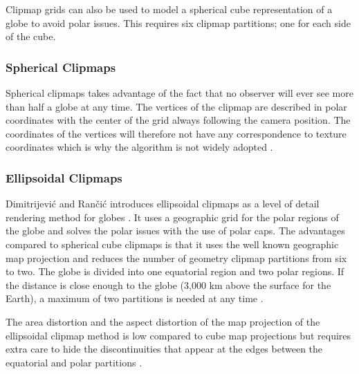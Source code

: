 Clipmap grids can also be used to model a spherical cube representation of a globe to avoid polar issues. This requires six clipmap partitions; one for each side of the cube.

\subsubsection{Spherical Clipmaps}
Spherical clipmaps takes advantage of the fact that no observer will ever see more than half a globe at any time. The vertices of the clipmap are described in polar coordinates with the center of the grid always following the camera position. The coordinates of the vertices will therefore not have any correspondence to texture coordinates which is why the algorithm is not widely adopted \cite{dimi15}. 

\subsubsection{Ellipsoidal Clipmaps}
Dimitrijevi\'{c} and Ran\v{c}i\'{c} introduces ellipsoidal clipmaps as a level of detail rendering method for globes \cite{dimi15}. It uses a geographic grid for the polar regions of the globe and solves the polar issues with the use of polar caps. The advantages compared to spherical cube clipmaps is that it uses the well known geographic map projection and reduces the number of geometry clipmap partitions from six to two. The globe is divided into one equatorial region and two polar regions. If the distance is close enough to the globe (3,000 km above the surface for the Earth), a maximum of two partitions is needed at any time \cite{dimi15}.

The area distortion and the aspect distortion of the map projection of the ellipsoidal clipmap method is low compared to cube map projections but requires extra care to hide the discontinuities that appear at the edges between the equatorial and polar partitions \cite{dimi15}.

